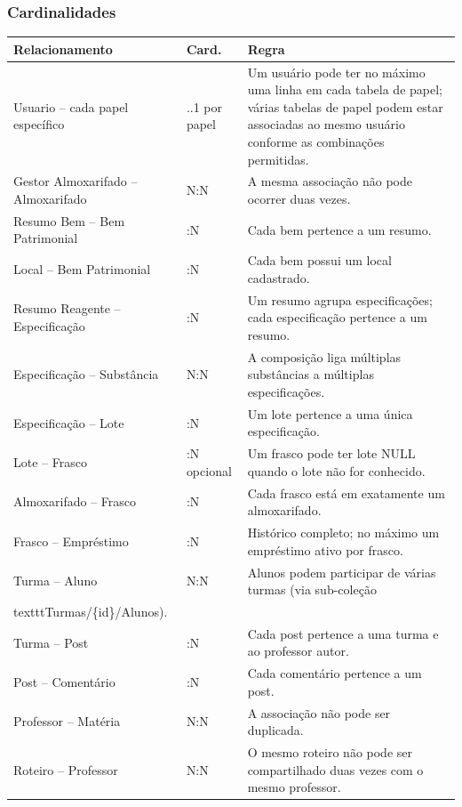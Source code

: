 \documentclass[12pt,a4paper]{article}
\begin{document}
\subsubsection{Cardinalidades}
\begin{center}
\small
\begin{tabularx}{0.96\textwidth}{>{\raggedright\arraybackslash}p{} >{\centering\arraybackslash}p{} >{\raggedright\arraybackslash}X}
\toprule
\textbf{Relacionamento} & \textbf{Card.} & \textbf{Regra}\\
\midrule
Usuario -- cada papel específico & 0..1 por papel & Um usuário pode ter no máximo uma linha em cada tabela de papel; várias tabelas de papel podem estar associadas ao mesmo usuário conforme as combinações permitidas.\\
Gestor Almoxarifado -- Almoxarifado & N:N & A mesma associação não pode ocorrer duas vezes.\\
Resumo Bem -- Bem Patrimonial & 1:N & Cada bem pertence a um resumo.\\
Local -- Bem Patrimonial & 1:N & Cada bem possui um local cadastrado.\\
Resumo Reagente -- Especificação & 1:N & Um resumo agrupa especificações; cada especificação pertence a um resumo.\\
Especificação -- Substância & N:N & A composição liga múltiplas substâncias a múltiplas especificações.\\
Especificação -- Lote & 1:N & Um lote pertence a uma única especificação.\\
Lote -- Frasco & 1:N opcional & Um frasco pode ter lote NULL quando o lote não for conhecido.\\
Almoxarifado -- Frasco & 1:N & Cada frasco está em exatamente um almoxarifado.\\
Frasco -- Empréstimo & 1:N & Histórico completo; no máximo um empréstimo ativo por frasco.\\
Turma -- Aluno & N:N & Alunos podem participar de várias turmas (via sub-coleção \\texttt{Turmas/\{id\}/Alunos}).\\
Turma -- Post & 1:N & Cada post pertence a uma turma e ao professor autor.\\
Post -- Comentário & 1:N & Cada comentário pertence a um post.\\
Professor -- Matéria & N:N & A associação não pode ser duplicada.\\
Roteiro -- Professor & N:N & O mesmo roteiro não pode ser compartilhado duas vezes com o mesmo professor.\\
\bottomrule
\end{tabularx}
\end{center}
\end{document}
